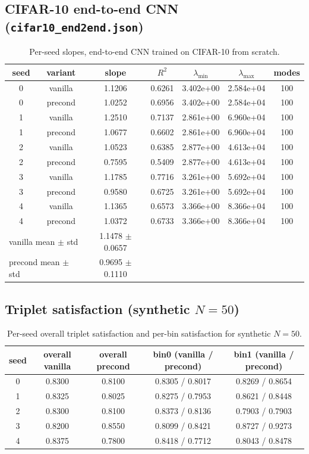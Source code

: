 \subsection{CIFAR-10 end-to-end CNN (\texttt{cifar10\_end2end.json})}
\begin{table}[H]
\centering
\caption{Per-seed slopes, end-to-end CNN trained on CIFAR-10 from scratch.}
\label{tab:precond-cifar10-e2e}
\begin{tabular}{c c c c c c c}
\toprule
seed & variant & slope & $R^2$ & $\lambda_{\min}$ & $\lambda_{\max}$ & modes \\
\midrule
0 & vanilla & 1.1206 & 0.6261 & 3.402e+00 & 2.584e+04 & 100 \\
0 & precond & 1.0252 & 0.6956 & 3.402e+00 & 2.584e+04 & 100 \\
1 & vanilla & 1.2510 & 0.7137 & 2.861e+00 & 6.960e+04 & 100 \\
1 & precond & 1.0677 & 0.6602 & 2.861e+00 & 6.960e+04 & 100 \\
2 & vanilla & 1.0523 & 0.6385 & 2.877e+00 & 4.613e+04 & 100 \\
2 & precond & 0.7595 & 0.5409 & 2.877e+00 & 4.613e+04 & 100 \\
3 & vanilla & 1.1785 & 0.7716 & 3.261e+00 & 5.692e+04 & 100 \\
3 & precond & 0.9580 & 0.6725 & 3.261e+00 & 5.692e+04 & 100 \\
4 & vanilla & 1.1365 & 0.6573 & 3.366e+00 & 8.366e+04 & 100 \\
4 & precond & 1.0372 & 0.6733 & 3.366e+00 & 8.366e+04 & 100 \\
\midrule
\multicolumn{2}{l}{vanilla mean $\pm$ std} & 1.1478 $\pm$ 0.0657 & & & & \\
\multicolumn{2}{l}{precond mean $\pm$ std} & 0.9695 $\pm$ 0.1110 & & & & \\
\bottomrule
\end{tabular}
\end{table}

\subsection{Triplet satisfaction (synthetic $N=50$)}
\begin{table}[H]
\centering
\caption{Per-seed overall triplet satisfaction and per-bin satisfaction for synthetic $N=50$.}
\label{tab:precond-sat}
\begin{tabular}{c c c c c}
\toprule
seed & overall vanilla & overall precond & bin0 (vanilla / precond) & bin1 (vanilla / precond) \\
\midrule
0 & 0.8300 & 0.8100 & 0.8305 / 0.8017 & 0.8269 / 0.8654 \\
1 & 0.8325 & 0.8025 & 0.8275 / 0.7953 & 0.8621 / 0.8448 \\
2 & 0.8300 & 0.8100 & 0.8373 / 0.8136 & 0.7903 / 0.7903 \\
3 & 0.8200 & 0.8550 & 0.8099 / 0.8421 & 0.8727 / 0.9273 \\
4 & 0.8375 & 0.7800 & 0.8418 / 0.7712 & 0.8043 / 0.8478 \\
\bottomrule
\end{tabular}
\end{table}
